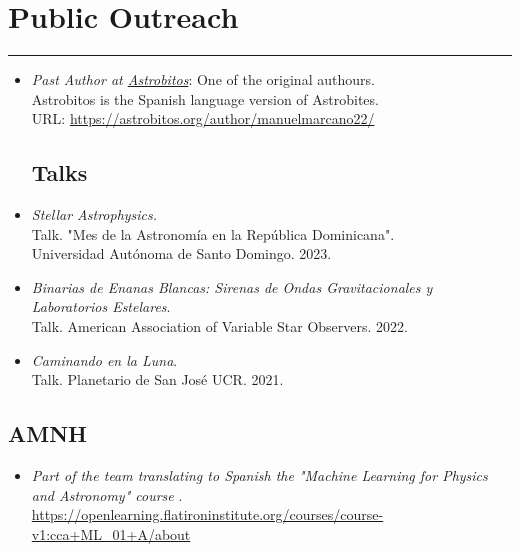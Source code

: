 \documentclass[letterpaper,10pt]{article}
\begin{document}
\section*{Public Outreach}
\hrule
\vspace{.3 cm}
\begin{itemize}[label=$\blacktriangleright$]

\item \emph{Past Author at \href{https://astrobitos.org/}{Astrobitos}}: One of the original authours. \\ Astrobitos is the Spanish language version of Astrobites.\\ URL: \url{https://astrobitos.org/author/manuelmarcano22/}


\subsection*{Talks}


\item \textit{Stellar Astrophysics.} \\
Talk. "Mes de la Astronom\'ia en la Rep\'ublica Dominicana". \\Universidad Aut\'onoma de Santo Domingo. 2023.


\item \textit{Binarias de Enanas Blancas: Sirenas de Ondas Gravitacionales y Laboratorios Estelares}. \\
Talk. American Association of Variable Star Observers. 2022.




\item \textit{Caminando en la Luna}. \\
Talk. Planetario de San Jos\'e UCR. 2021.
\end{itemize}



\subsection*{AMNH}

\begin{itemize}[label=$\blacktriangleright$]

	\item \textit{Part of the team translating to Spanish the "Machine Learning for Physics and Astronomy" course }. \\
\url{https://openlearning.flatironinstitute.org/courses/course-v1:cca+ML_01+A/about}

\end{itemize}
\end{document}
